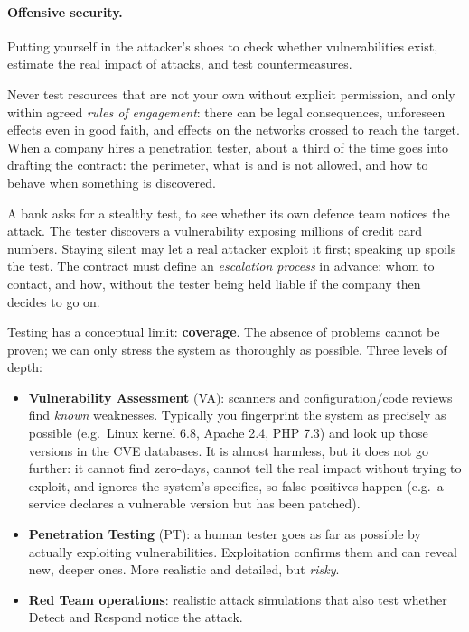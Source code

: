 \paragraph{Offensive security.} Putting yourself in the attacker's shoes to check whether vulnerabilities exist, estimate the real impact of attacks, and test countermeasures.

\begin{remark}
Never test resources that are not your own without explicit permission, and only within agreed \emph{rules of engagement}: there can be legal consequences, unforeseen effects even in good faith, and effects on the networks crossed to reach the target. When a company hires a penetration tester, about a third of the time goes into drafting the contract: the perimeter, what is and is not allowed, and how to behave when something is discovered.
\end{remark}

\begin{example}
A bank asks for a stealthy test, to see whether its own defence team notices the attack. The tester discovers a vulnerability exposing millions of credit card numbers. Staying silent may let a real attacker exploit it first; speaking up spoils the test. The contract must define an \emph{escalation process} in advance: whom to contact, and how, without the tester being held liable if the company then decides to go on.
\end{example}

Testing has a conceptual limit: \textbf{coverage}. The absence of problems cannot be proven; we can only stress the system as thoroughly as possible. Three levels of depth:
\begin{itemize}
    \item \textbf{Vulnerability Assessment} (VA): scanners and configuration/code reviews find \emph{known} weaknesses. Typically you fingerprint the system as precisely as possible (e.g.\ Linux kernel 6.8, Apache 2.4, PHP 7.3) and look up those versions in the CVE databases. It is almost harmless, but it does not go further: it cannot find zero-days, cannot tell the real impact without trying to exploit, and ignores the system's specifics, so false positives happen (e.g.\ a service declares a vulnerable version but has been patched).
    \item \textbf{Penetration Testing} (PT): a human tester goes as far as possible by actually exploiting vulnerabilities. Exploitation confirms them and can reveal new, deeper ones. More realistic and detailed, but \emph{risky}.
    \item \textbf{Red Team operations}: realistic attack simulations that also test whether Detect and Respond notice the attack.
\end{itemize}

